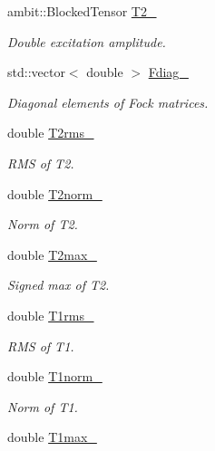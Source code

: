 \begin{DoxyCompactItemize}
ambit\+::\+Blocked\+Tensor \mbox{\hyperlink{classforte_1_1_d_s_r_g___m_r_p_t_a323d1a4b7b9f8ea30e8da4229063da56}{T2\+\_\+}}
\begin{DoxyCompactList}\small\item\em Double excitation amplitude. \end{DoxyCompactList}\item 
std\+::vector$<$ double $>$ \mbox{\hyperlink{classforte_1_1_d_s_r_g___m_r_p_t_a4d89836fdc0036566a07188c1ac44ef1}{Fdiag\+\_\+}}
\begin{DoxyCompactList}\small\item\em Diagonal elements of Fock matrices. \end{DoxyCompactList}\item 
double \mbox{\hyperlink{classforte_1_1_d_s_r_g___m_r_p_t_a8c5cfd5ffcbc9b06ac3fb2d65827d30d}{T2rms\+\_\+}}
\begin{DoxyCompactList}\small\item\em R\+MS of T2. \end{DoxyCompactList}\item 
double \mbox{\hyperlink{classforte_1_1_d_s_r_g___m_r_p_t_a75235ed0a5a7573f4fb04c558809e0f7}{T2norm\+\_\+}}
\begin{DoxyCompactList}\small\item\em Norm of T2. \end{DoxyCompactList}\item 
double \mbox{\hyperlink{classforte_1_1_d_s_r_g___m_r_p_t_adfcca14284a1d7d6eb1118f22187edac}{T2max\+\_\+}}
\begin{DoxyCompactList}\small\item\em Signed max of T2. \end{DoxyCompactList}\item 
double \mbox{\hyperlink{classforte_1_1_d_s_r_g___m_r_p_t_a7898973195cd57960c0cce1ba01b19d7}{T1rms\+\_\+}}
\begin{DoxyCompactList}\small\item\em R\+MS of T1. \end{DoxyCompactList}\item 
double \mbox{\hyperlink{classforte_1_1_d_s_r_g___m_r_p_t_a0b90b32c76cdf23134431ccf26439d85}{T1norm\+\_\+}}
\begin{DoxyCompactList}\small\item\em Norm of T1. \end{DoxyCompactList}\item 
double \mbox{\hyperlink{classforte_1_1_d_s_r_g___m_r_p_t_a2f86a9d9a8ca93ad8926f8c6903d9e8c}{T1max\+\_\+}}

\end{DoxyCompactItemize}
